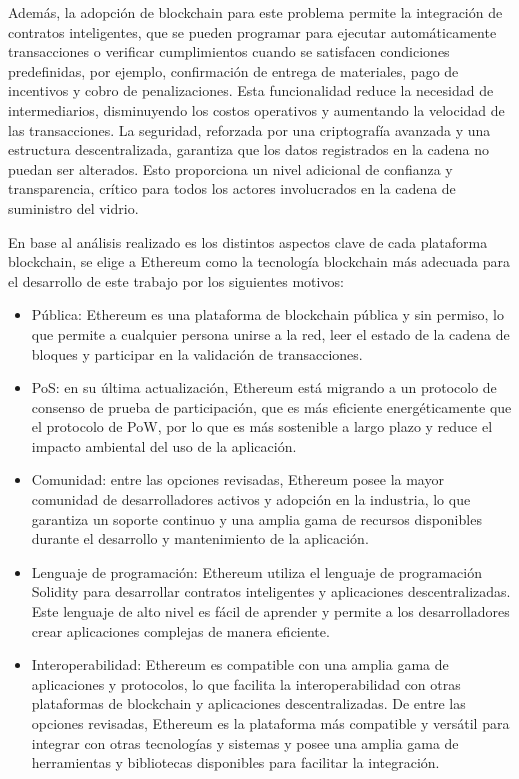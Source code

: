 \documentclass[theoretical-framework.tex]{subfiles}
\begin{document}
Además, la adopción de blockchain para este problema permite la integración de contratos inteligentes, que se pueden programar para ejecutar automáticamente transacciones o verificar cumplimientos cuando se satisfacen condiciones predefinidas, por ejemplo, confirmación de entrega de materiales, pago de incentivos y cobro de penalizaciones. Esta funcionalidad reduce la necesidad de intermediarios, disminuyendo los costos operativos y aumentando la velocidad de las transacciones. La seguridad, reforzada por una criptografía avanzada y una estructura descentralizada, garantiza que los datos registrados en la cadena no puedan ser alterados. Esto proporciona un nivel adicional de confianza y transparencia, crítico para todos los actores involucrados en la cadena de suministro del vidrio.

En base al análisis realizado es los distintos aspectos clave de cada plataforma blockchain, se elige a Ethereum como la tecnología blockchain más adecuada para el desarrollo de este trabajo por los siguientes motivos:

\begin{itemize}
	\item Pública: Ethereum es una plataforma de blockchain pública y sin permiso, lo que permite a cualquier persona unirse a la red, leer el estado de la cadena de bloques y participar en la validación de transacciones.
	\item PoS: en su última actualización, Ethereum está migrando a un protocolo de consenso de prueba de participación, que es más eficiente energéticamente que el protocolo de PoW, por lo que es más sostenible a largo plazo y reduce el impacto ambiental del uso de la aplicación.
	\item Comunidad: entre las opciones revisadas, Ethereum posee la mayor comunidad de desarrolladores activos y adopción en la industria, lo que garantiza un soporte continuo y una amplia gama de recursos disponibles durante el desarrollo y mantenimiento de la aplicación. 
	\item Lenguaje de programación: Ethereum utiliza el lenguaje de programación Solidity para desarrollar contratos inteligentes y aplicaciones descentralizadas. Este lenguaje de alto nivel es fácil de aprender y permite a los desarrolladores crear aplicaciones complejas de manera eficiente.
	\item Interoperabilidad: Ethereum es compatible con una amplia gama de aplicaciones y protocolos, lo que facilita la interoperabilidad con otras plataformas de blockchain y aplicaciones descentralizadas. De entre las opciones revisadas, Ethereum es la plataforma más compatible y versátil para integrar con otras tecnologías y sistemas y posee una amplia gama de herramientas y bibliotecas disponibles para facilitar la integración.
\end{itemize}
\end{document}
